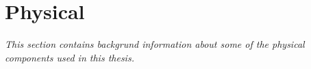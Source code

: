 \section{Physical}
\label{sec:tPhysical}
\textit{This section contains backgrund information about some of the physical components used in this thesis.}


